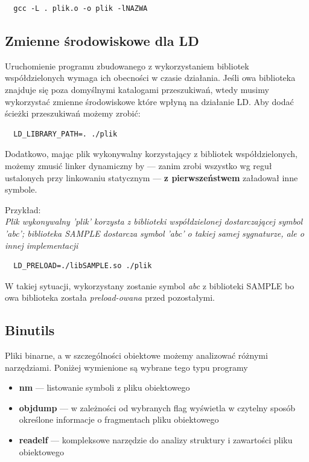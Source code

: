 \documentclass[12pt]{article}
\begin{document}
\begin{lstlisting}
  gcc -L . plik.o -o plik -lNAZWA

\end{lstlisting}
\subsection{Zmienne środowiskowe dla LD}
Uruchomienie programu zbudowanego z wykorzystaniem bibliotek współdzielonych
wymaga ich obecności w czasie działania. Jeśli owa biblioteka znajduje się poza
domyślnymi katalogami przeszukiwań, wtedy musimy wykorzystać zmienne
środowiskowe które wpłyną na działanie LD. Aby dodać ścieżki przeszukiwań możemy
zrobić:

\begin{lstlisting}
  LD_LIBRARY_PATH=. ./plik
\end{lstlisting}

Dodatkowo, mając plik wykonywalny korzystający z bibliotek współdzielonych,
możemy zmusić linker dynamiczny by --- zanim zrobi wszystko wg reguł ustalonych
przy linkowaniu statycznym --- \textbf{z pierwszeństwem} załadował inne symbole.

Przykład:\\
\textit{Plik wykonywalny 'plik' korzysta z biblioteki współdzielonej
  dostarczającej symbol 'abc'; biblioteka SAMPLE dostarcza symbol 'abc' o takiej
  samej sygnaturze, ale o innej implementacji}

\begin{lstlisting}
  LD_PRELOAD=./libSAMPLE.so ./plik
\end{lstlisting}

W takiej sytuacji, wykorzystany zostanie symbol \textit{abc} z biblioteki SAMPLE
bo owa biblioteka została \textit{preload-owana} przed pozostałymi.

\subsection{Binutils}
Pliki binarne, a w szczególności obiektowe możemy analizować różnymi
narzędziami. Poniżej wymienione są wybrane tego typu programy

\begin{itemize}
\item \textbf{nm} --- listowanie symboli z pliku obiektowego
\item \textbf{objdump} --- w zależności od wybranych flag wyświetla w czytelny
  sposób określone informacje o fragmentach pliku obiektowego
\item \textbf{readelf} --- kompleksowe narzędzie do analizy struktury i
  zawartości pliku obiektowego
\end{itemize}
\end{document}
